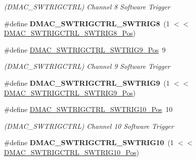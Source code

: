 \begin{DoxyCompactItemize}
\begin{DoxyCompactList}\small\item\em (D\+M\+A\+C\+\_\+\+S\+W\+T\+R\+I\+G\+C\+T\+R\+L) Channel 8 Software Trigger \end{DoxyCompactList}\item 
\hypertarget{group___s_a_m_l21___d_m_a_c_gae5968e9a6c8ba75917b349ca0291c5b2}{}\#define {\bfseries D\+M\+A\+C\+\_\+\+S\+W\+T\+R\+I\+G\+C\+T\+R\+L\+\_\+\+S\+W\+T\+R\+I\+G8}~(1 $<$$<$ \hyperlink{group___s_a_m_l21___d_m_a_c_ga87e5acebf240a2ecb15907625e50a301}{D\+M\+A\+C\+\_\+\+S\+W\+T\+R\+I\+G\+C\+T\+R\+L\+\_\+\+S\+W\+T\+R\+I\+G8\+\_\+\+Pos})\label{group___s_a_m_l21___d_m_a_c_gae5968e9a6c8ba75917b349ca0291c5b2}

\item 
\hypertarget{group___s_a_m_l21___d_m_a_c_gaa72c18b3d4d2b1db023c1813e5ea0ac2}{}\#define \hyperlink{group___s_a_m_l21___d_m_a_c_gaa72c18b3d4d2b1db023c1813e5ea0ac2}{D\+M\+A\+C\+\_\+\+S\+W\+T\+R\+I\+G\+C\+T\+R\+L\+\_\+\+S\+W\+T\+R\+I\+G9\+\_\+\+Pos}~9\label{group___s_a_m_l21___d_m_a_c_gaa72c18b3d4d2b1db023c1813e5ea0ac2}

\begin{DoxyCompactList}\small\item\em (D\+M\+A\+C\+\_\+\+S\+W\+T\+R\+I\+G\+C\+T\+R\+L) Channel 9 Software Trigger \end{DoxyCompactList}\item 
\hypertarget{group___s_a_m_l21___d_m_a_c_gaa3c04b47dfccaa751b7ea0a22053c209}{}\#define {\bfseries D\+M\+A\+C\+\_\+\+S\+W\+T\+R\+I\+G\+C\+T\+R\+L\+\_\+\+S\+W\+T\+R\+I\+G9}~(1 $<$$<$ \hyperlink{group___s_a_m_l21___d_m_a_c_gaa72c18b3d4d2b1db023c1813e5ea0ac2}{D\+M\+A\+C\+\_\+\+S\+W\+T\+R\+I\+G\+C\+T\+R\+L\+\_\+\+S\+W\+T\+R\+I\+G9\+\_\+\+Pos})\label{group___s_a_m_l21___d_m_a_c_gaa3c04b47dfccaa751b7ea0a22053c209}

\item 
\hypertarget{group___s_a_m_l21___d_m_a_c_gad43087169a9eb87627d66b7b787d38a8}{}\#define \hyperlink{group___s_a_m_l21___d_m_a_c_gad43087169a9eb87627d66b7b787d38a8}{D\+M\+A\+C\+\_\+\+S\+W\+T\+R\+I\+G\+C\+T\+R\+L\+\_\+\+S\+W\+T\+R\+I\+G10\+\_\+\+Pos}~10\label{group___s_a_m_l21___d_m_a_c_gad43087169a9eb87627d66b7b787d38a8}

\begin{DoxyCompactList}\small\item\em (D\+M\+A\+C\+\_\+\+S\+W\+T\+R\+I\+G\+C\+T\+R\+L) Channel 10 Software Trigger \end{DoxyCompactList}\item 
\hypertarget{group___s_a_m_l21___d_m_a_c_ga742f78741a8f3ac74aa5537b4f2297ab}{}\#define {\bfseries D\+M\+A\+C\+\_\+\+S\+W\+T\+R\+I\+G\+C\+T\+R\+L\+\_\+\+S\+W\+T\+R\+I\+G10}~(1 $<$$<$ \hyperlink{group___s_a_m_l21___d_m_a_c_gad43087169a9eb87627d66b7b787d38a8}{D\+M\+A\+C\+\_\+\+S\+W\+T\+R\+I\+G\+C\+T\+R\+L\+\_\+\+S\+W\+T\+R\+I\+G10\+\_\+\+Pos})\label{group___s_a_m_l21___d_m_a_c_ga742f78741a8f3ac74aa5537b4f2297ab}


\end{DoxyCompactItemize}
